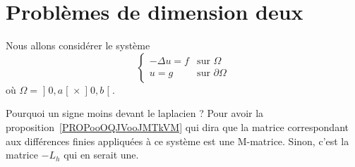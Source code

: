 \section{Problèmes de dimension deux}

Nous allons considérer le système
\begin{equation}                \label{SYSooTANLooRgnIMp}
    \begin{cases}
        -\Delta u=f & \text{sur } \Omega         \\
        u=g         & \text{sur } \partial\Omega
    \end{cases}
\end{equation}
où \( \Omega=\mathopen] 0 , a \mathclose[\times \mathopen] 0 , b \mathclose[\).

\begin{remark}
Pourquoi un signe moins devant le laplacien ? Pour avoir la proposition~\ref{PROPooOQJVooJMTkVM} qui dira que la matrice correspondant aux différences finies appliquées à ce système est une M-matrice. Sinon, c'est la matrice \(-L_h\) qui en serait une.
\end{remark}
